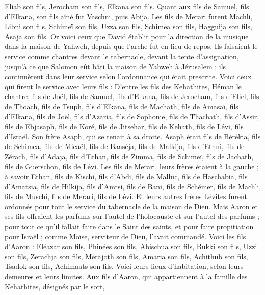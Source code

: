 \begin{multicols}{2}
Eliab son fils, Jerocham son fils, Elkana son fils.
Quant aux fils de Samuel, fils d'Elkana, son fils aîné fut Vaschni, puis Abija.
Les fils de Merari furent Machli, Libni son fils, Schimeï son fils, Uzza son fils,
Schimea son fils, Hagguija son fils, Asaja son fils.
Or voici ceux que David établit pour la direction de la musique dans la maison de Yahweh, depuis que l’arche fut en lieu de repos.
Ils faisaient le service comme chantres devant le tabernacle, devant la tente d'assignation, jusqu'à ce que Salomon eût bâti la maison de Yahweh à Jérusalem ; ils continuèrent dans leur service selon l'ordonnance qui était prescrite. Voici ceux qui firent le service avec leurs fils : D'entre les fils des Kehathites, Héman le chantre, fils de Joël, fils de Samuel,
fils d'Elkana, fils de Jerocham, fils d’Eliel, fils de Thoach,
fils de Tsuph, fils d'Elkana, fils de Machath, fils de Amasaï,
fils d'Elkana, fils de Joël, fils d’Azaria, fils de Sophonie,
fils de Thachath, fils d'Assir, fils de Ebjasaph, fils de Koré,
fils de Jitsehar, fils de Kehath, fils de Lévi, fils d'Israël.
Son frère Asaph, qui se tenait à sa droite. Asaph était fils de Bérékia, fils de Schimea,
fils de Micaël, fils de Baaséja, fils de Malkija,
fils d’Ethni, fils de Zérach, fils d’Adaja,
fils d'Ethan, fils de Zimma, fils de Schimeï,
fils de Jachath, fils de Guerschon, fils de Lévi.
Les fils de Merari, leurs frères étaient à la gauche ; à savoir Ethan, fils de Kischi, fils d’Abdi, fils de Malluc,
fils de Haschabia, fils d'Amatsia, fils de Hilkija,
fils d'Amtsi, fils de Bani, fils de Schémer,
fils de Machli, fils de Muschi, fils de Merari, fils de Lévi.
Et leurs autres frères Lévites furent ordonnés pour tout le service du tabernacle de la maison de Dieu.
Mais Aaron et ses fils offraient les parfums sur l'autel de l'holocauste et sur l'autel des parfums ; pour tout ce qu'il fallait faire dans le Saint des saints, et pour faire propitiation pour Israël ; comme Moïse, serviteur de Dieu, l'avait commandé.
Voici les fils d'Aaron : Eléazar son fils, Phinées son fils, Abischua son fils,
Bukki son fils, Uzzi son fils, Zerachja son fils,
Merajoth son fils, Amaria son fils, Achithub son fils,
Tsadok son fils, Achimaats son fils.
Voici leurs lieux d’habitation, selon leurs demeures et leurs limites. Aux fils d'Aaron, qui appartiennent à la famille des Kehathites, désignés par le sort,

\end{multicols}
